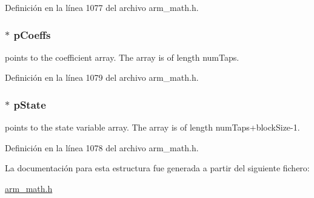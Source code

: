 Definición en la línea 1077 del archivo arm\+\_\+math.\+h.

\subsubsection[{\texorpdfstring{p\+Coeffs}{pCoeffs}}]{$\ast$ p\+Coeffs}\hypertarget{structarm__fir__instance__f32_aacbb8dd8eeba4b21fc2bb40076405ee3}{}\label{structarm__fir__instance__f32_aacbb8dd8eeba4b21fc2bb40076405ee3}
points to the coefficient array. The array is of length num\+Taps. 

Definición en la línea 1079 del archivo arm\+\_\+math.\+h.

\subsubsection[{\texorpdfstring{p\+State}{pState}}]{$\ast$ p\+State}\hypertarget{structarm__fir__instance__f32_a335c87e6fdc4b96601d95a5de8b9c463}{}\label{structarm__fir__instance__f32_a335c87e6fdc4b96601d95a5de8b9c463}
points to the state variable array. The array is of length num\+Taps+block\+Size-\/1. 

Definición en la línea 1078 del archivo arm\+\_\+math.\+h.



La documentación para esta estructura fue generada a partir del siguiente fichero\+:\begin{DoxyCompactItemize}
\item 
\hyperlink{arm__math_8h}{arm\+\_\+math.\+h}\end{DoxyCompactItemize}
